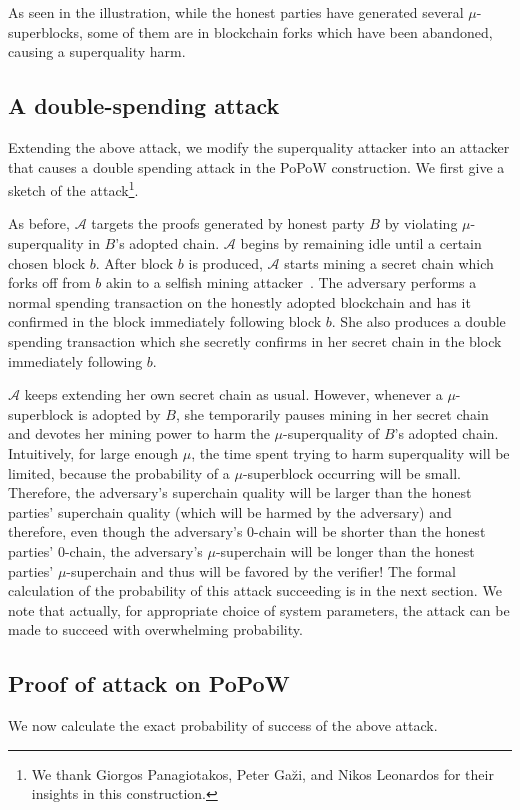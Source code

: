 As seen in the illustration, while the honest parties have generated several
$\mu$-superblocks, some of them are in blockchain forks which have been
abandoned, causing a superquality harm.

\subsection{A double-spending attack}
Extending the above attack, we modify the superquality attacker into an attacker
that causes a double spending attack in the PoPoW construction. We first give
a sketch of the attack\footnote{We thank Giorgos Panagiotakos, Peter
Ga\u{z}i, and Nikos Leonardos for their insights in this construction.}.

As before, $\mathcal{A}$ targets the proofs generated by honest party $B$ by
violating $\mu$-superquality in $B$'s adopted chain. $\mathcal{A}$ begins by
remaining idle until a certain chosen block $b$. After block $b$ is produced,
$\mathcal{A}$ starts mining a secret chain which forks off from $b$ akin to a
selfish mining attacker~\cite{selfish}. The adversary performs a normal spending
transaction on the honestly adopted blockchain and has it confirmed in the block
immediately following block $b$. She also produces a double spending transaction
which she secretly confirms in her secret chain in the block immediately
following $b$.

$\mathcal{A}$ keeps extending her own secret chain as usual. However, whenever a
$\mu$-superblock is adopted by $B$, she temporarily pauses mining in her secret
chain and devotes her mining power to harm the $\mu$-superquality of $B$'s
adopted chain. Intuitively, for large enough $\mu$, the time spent trying to
harm superquality will be limited, because the probability of a $\mu$-superblock
occurring will be small. Therefore, the adversary's superchain quality will be
larger than the honest parties' superchain quality (which will be harmed by the
adversary) and therefore, even though the adversary's $0$-chain will be shorter
than the honest parties' $0$-chain, the adversary's $\mu$-superchain will be
longer than the honest parties' $\mu$-superchain and thus will be favored by the
verifier! The formal calculation of the probability of this attack succeeding is
in the next section. We note that actually, for appropriate choice of system
parameters, the attack can be made to succeed with overwhelming probability.

\subsection{Proof of attack on PoPoW}
\label{sec:attack-full}
We now calculate the exact probability of success of the above attack.

